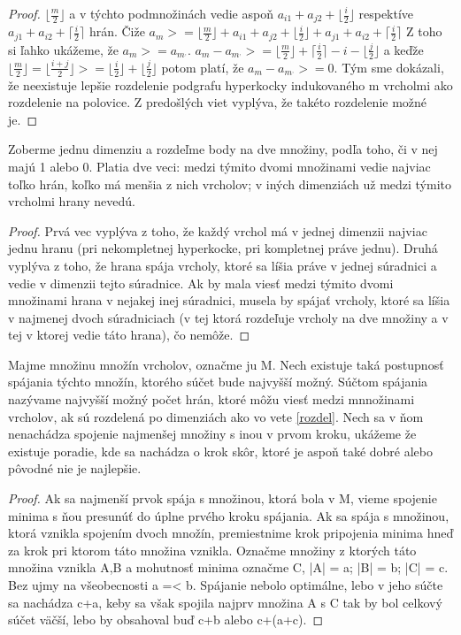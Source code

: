 \begin{proof}
$\lfloor \frac{m}{2} \rfloor$ a v týchto podmnožinách vedie aspoň $a_{i1} +
a_{j2} + \lfloor \frac{i}{2} \rfloor $ respektíve $a_{j1} + a_{i2} + 
\lceil \frac{i}{2} \rceil$ hrán.
Čiže $a_{m} >= \lfloor \frac{m}{2} \rfloor + a_{i1} +
a_{j2} + \lfloor \frac{i}{2} \rfloor + a_{j1} + a_{i2} + 
\lceil \frac{i}{2} \rceil$
Z toho si ľahko ukážeme, že $a_{m} >= a_{m^{,}}$.
 $a_{m} - a_{m^{,}} >= \lfloor \frac{m}{2}\rfloor + \lceil \frac{i}{2}
\rceil - i - \lfloor \frac{j}{2} \rfloor$ a keďže 
$\lfloor \frac{m}{2}\rfloor = \lfloor \frac{i+j}{2}\rfloor >= \lfloor \frac{i}{2} \rfloor + \lfloor \frac{j}{2} \rfloor$
potom platí, že $a_{m} - a_{m^{,}} >=0$. Tým sme dokázali, že neexistuje
lepšie rozdelenie podgrafu hyperkocky indukovaného m vrcholmi ako rozdelenie
na polovice. Z predošlých viet vyplýva, že takéto rozdelenie možné je.
\end{proof}




\begin{veta}
\label{rozdel}
Zoberme jednu dimenziu a rozdeľme body na dve množiny, podľa toho,
či v nej majú 1 alebo 0. Platia dve veci: medzi týmito dvomi množinami vedie
najviac toľko hrán, koľko má menšia z nich vrcholov; v iných dimenziách už
medzi týmito vrcholmi hrany nevedú.
\end{veta}
\begin{proof}
Prvá vec vyplýva z toho, že každý vrchol má v jednej dimenzii najviac jednu
hranu (pri nekompletnej hyperkocke, pri kompletnej práve jednu).
Druhá vyplýva z toho, že hrana spája vrcholy, ktoré sa líšia práve v jednej
súradnici a vedie v dimenzii tejto súradnice. Ak by mala viesť medzi týmito
dvomi množinami hrana v nejakej inej súradnici, musela by spájať vrcholy,
ktoré sa líšia v najmenej dvoch súradniciach (v tej ktorá rozdeľuje vrcholy
na dve množiny a v tej v ktorej vedie táto hrana), čo nemôže.
\end{proof}


\begin{veta}
Majme množinu množín vrcholov, označme
ju M. Nech existuje taká postupnosť spájania týchto množín,
ktorého súčet bude najvyšší možný. Súčtom spájania nazývame najvyšší možný
počet hrán, ktoré môžu viesť medzi mnnožinami vrcholov, ak sú rozdelená po
dimenziách ako vo vete \ref{rozdel}.
Nech sa v ňom nenachádza spojenie
najmenšej množiny s inou v prvom kroku, ukážeme že existuje poradie, kde sa
nachádza o krok skôr, ktoré je aspoň také dobré alebo pôvodné nie je
najlepšie.
\end{veta}
\begin{proof}
Ak sa najmenší prvok spája s množinou, ktorá bola v M, vieme spojenie minima
s ňou presunúť do úplne prvého kroku spájania.
Ak sa spája s množinou, ktorá vznikla spojením dvoch množín, premiestnime
krok pripojenia minima hneď za krok pri ktorom táto množina vznikla. Označme
  množiny z ktorých táto množina vznikla A,B a mohutnosť minima 
označme C, |A| = a; |B| = b; |C| = c.
Bez ujmy na všeobecnosti a =< b. Spájanie nebolo optimálne, lebo v jeho súčte sa nachádza
c+a, keby sa však spojila najprv množina A s C tak by bol celkový súčet
väčší, lebo by obsahoval buď c+b alebo c+(a+c).
\end{proof}

